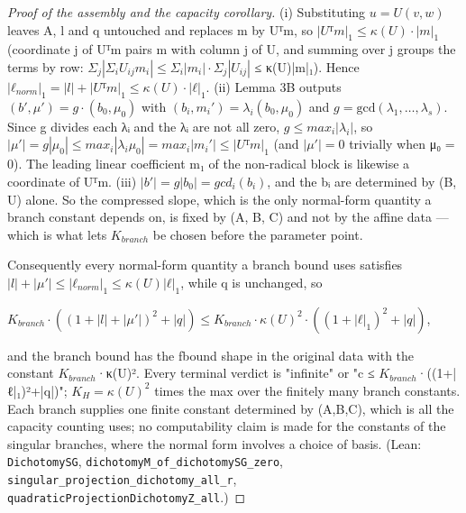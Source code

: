 \documentclass[11pt]{article}
\theoremstyle{plain}
\theoremstyle{definition}
\theoremstyle{remark}
\theoremstyle{plain}
\theoremstyle{definition}
\theoremstyle{remark}
\theoremstyle{plain}
\theoremstyle{definition}
\theoremstyle{remark}
\begin{document}
\begin{proof}[Proof of the assembly and the capacity corollary]
(i)   Substituting $u = U(v,w)$ leaves A, l and q untouched and replaces m by         Uᵀm, so $|Uᵀm|_{1} ≤ κ(U)·|m|_{1}$ (coordinate j of Uᵀm pairs m with column j of U,         and summing over j groups the terms by row: $Σ_{j}|Σ_{i} U_{ij}m_{i}| ≤ Σ_{i}|m_{i}|·Σ_{j}|U_{ij}|$         ≤ κ(U)|m|₁). Hence $|ℓ_{norm}|_{1} = |l| + |Uᵀm|_{1} ≤ κ(U)·|ℓ|_{1}$.   (ii)  Lemma 3B outputs $(b′, μ′) = g·(b_{0}, μ_{0})$ with $(b_{i}, m_{i}′) = λ_{i}(b_{0}, μ_{0})$ and         $g = \mathrm{gcd}(λ_{1},…,λ_{s})$. Since g divides each λᵢ and the λᵢ are not all zero,         $g ≤ max_{i}|λ_{i}|$, so $|μ′| = g|μ_{0}| ≤ max_{i}|λ_{i}μ_{0}| = max_{i}|m_{i}′| ≤ |Uᵀm|_{1}$ (and         $|μ′| = 0$ trivially when μ₀ = 0). The leading linear coefficient m₁ of         the non-radical block is likewise a coordinate of Uᵀm.   (iii) $|b′| = g|b_{0}| = gcd_{i}(b_{i})$, and the bᵢ are determined by (B, U) alone.         So the compressed slope, which is the only normal-form quantity a branch         constant depends on, is fixed by (A, B, C) and not by the affine data —         which is what lets $K_{branch}$ be chosen before the parameter point.

Consequently every normal-form quantity a branch bound uses satisfies $|l| + |μ′| ≤ |ℓ_{norm}|_{1} ≤ κ(U)|ℓ|_{1}$, while q is unchanged, so

$K_{branch}·((1+|l|+|μ′|)^{2} + |q|) ≤ K_{branch}·κ(U)^{2}·((1+|ℓ|_{1})^{2} + |q|)$,

and the branch bound has the fbound shape in the original data with the constant $K_{branch}$·κ(U)². Every terminal verdict is "infinite" or "c ≤ $K_{branch}$·((1+|ℓ|₁)²+|q|)"; $K_{H} = κ(U)^{2}$ times the max over the finitely many branch constants. Each branch supplies one finite constant determined by (A,B,C), which is all the capacity counting uses; no computability claim is made for the constants of the singular branches, where the normal form involves a choice of basis. (Lean: \texttt{DichotomySG}, \texttt{dichotomyM\_\allowbreak{}of\_\allowbreak{}dichotomySG\_\allowbreak{}zero}, \texttt{singular\_\allowbreak{}projection\_\allowbreak{}dichotomy\_\allowbreak{}all\_\allowbreak{}r}, \texttt{quadraticProjectionDichotomyZ\_\allowbreak{}all}.)


\end{proof}
\end{document}
